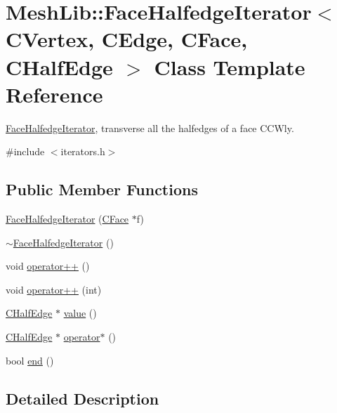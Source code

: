 \hypertarget{class_mesh_lib_1_1_face_halfedge_iterator}{}\section{Mesh\+Lib\+:\+:Face\+Halfedge\+Iterator$<$ C\+Vertex, C\+Edge, C\+Face, C\+Half\+Edge $>$ Class Template Reference}
\label{class_mesh_lib_1_1_face_halfedge_iterator}


\hyperlink{class_mesh_lib_1_1_face_halfedge_iterator}{Face\+Halfedge\+Iterator}, transverse all the halfedges of a face C\+C\+Wly.  




{\ttfamily \#include $<$iterators.\+h$>$}

\subsection*{Public Member Functions}
\begin{DoxyCompactItemize}
\item 
\hyperlink{class_mesh_lib_1_1_face_halfedge_iterator_ad0206cbb7214b717bbc625bab2b54f5e}{Face\+Halfedge\+Iterator} (\hyperlink{class_mesh_lib_1_1_c_face}{C\+Face} $\ast$f)
\item 
\hyperlink{class_mesh_lib_1_1_face_halfedge_iterator_ac309d80e77edba4b83cb3c365ac5713f}{$\sim$\+Face\+Halfedge\+Iterator} ()
\item 
void \hyperlink{class_mesh_lib_1_1_face_halfedge_iterator_ad9957d1e32cb93adce990fb978d0331c}{operator++} ()
\item 
void \hyperlink{class_mesh_lib_1_1_face_halfedge_iterator_aa086c815a7f0aee20dd7f619103bd130}{operator++} (int)
\item 
\hyperlink{class_mesh_lib_1_1_c_half_edge}{C\+Half\+Edge} $\ast$ \hyperlink{class_mesh_lib_1_1_face_halfedge_iterator_a11ab5569fee0954568104005ad63db80}{value} ()
\item 
\hyperlink{class_mesh_lib_1_1_c_half_edge}{C\+Half\+Edge} $\ast$ \hyperlink{class_mesh_lib_1_1_face_halfedge_iterator_a4a893aa715532f4c13cdde4e13fcff81}{operator$\ast$} ()
\item 
bool \hyperlink{class_mesh_lib_1_1_face_halfedge_iterator_af899bde10dcb1883ac26e66930fc3082}{end} ()
\end{DoxyCompactItemize}


\subsection{Detailed Description}
